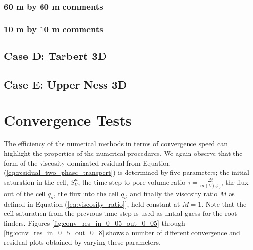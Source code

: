 \subsubsection{60 m by 60 m comments}




\clearpage
\subsubsection{10 m by 10 m comments}


%

\clearpage
\subsection{Case D: Tarbert 3D}
\label{section:caseD}


\clearpage
\subsection{Case E: Upper Ness 3D}
\label{section:caseE}


\clearpage
\section{Convergence Tests}
\label{section:numerical_results_convergence_tests}
The efficiency of the numerical methods in terms of convergence speed can highlight the properties of the numerical procedures. We again  observe that the form of the viscosity dominated residual from Equation (\ref{eq:residual_two_phase_transport}) is determined by five parameters; the initial saturation in the cell, $S_V^{n}$, the time step to pore volume ratio $\tau = \frac{\Delta t}{m(V)\phi_V}$, the flux out of the cell $q_o$, the flux into the cell $q_i$, and finally the viscosity ratio $M$ as defined in Equation (\ref{eq:viscosity_ratio}), held constant at $M = 1$. Note that the cell saturation from the previous time step is used as initial guess for the root finders. Figures \ref{fig:conv_res_in_0_05_out_0_05} through \ref{fig:conv_res_in_0_5_out_0_8} shows a number of different convergence and residual plots obtained by varying these parameters. 

